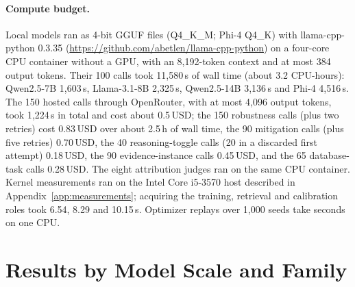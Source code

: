 \paragraph{Compute budget.}
Local models ran as 4-bit GGUF files (Q4\_K\_M; Phi-4 Q4\_K) with llama-cpp-python 0.3.35 (\url{https://github.com/abetlen/llama-cpp-python}) on a four-core CPU container without a GPU, with an 8,192-token context and at most 384 output tokens. Their 100 calls took 11,580\,s of wall time (about 3.2 CPU-hours): Qwen2.5-7B 1,603\,s, Llama-3.1-8B 2,325\,s, Qwen2.5-14B 3,136\,s and Phi-4 4,516\,s. The 150 hosted calls through OpenRouter, with at most 4,096 output tokens, took 1,224\,s in total and cost about 0.5\,USD; the 150 robustness calls (plus two retries) cost 0.83\,USD over about 2.5\,h of wall time, the 90 mitigation calls (plus five retries) 0.70\,USD, the 40 reasoning-toggle calls (20 in a discarded first attempt) 0.18\,USD, the 90 evidence-instance calls 0.45\,USD, and the 65 database-task calls 0.28\,USD. The eight attribution judges ran on the same CPU container. Kernel measurements ran on the Intel Core i5-3570 host described in Appendix~\ref{app:measurements}; acquiring the training, retrieval and calibration roles took 6.54, 8.29 and 10.15\,s. Optimizer replays over 1,000 seeds take seconds on one CPU.


\section{Results by Model Scale and Family}
\label{app:scale}
\begin{table}[t]
\centering\footnotesize\setlength{\tabcolsep}{3pt}
\caption{Full-context results by model: answers choosing the selector's configuration (Sel.), cited retrieval runs of the chosen configuration and from the first half of the evidence list, misstated claims, and misstated claims by type (overstated / wrong value / wrong unit or source). Gemini parameter counts are undisclosed.}
\label{tab:scale}

\end{table}

\begin{table}[t]
\centering\footnotesize\setlength{\tabcolsep}{3pt}
\caption{Hosted models under prompt, order, cap and decoding variations (30 answers per condition): answers choosing the selector's configuration (Sel.), mean citations per answer, cited retrieval runs of the chosen configuration, in the first half of the list as presented, and from blocks 0--4, and explanations with a quantifier overstatement (automatic proxy).}
\label{tab:robust}

\end{table}

